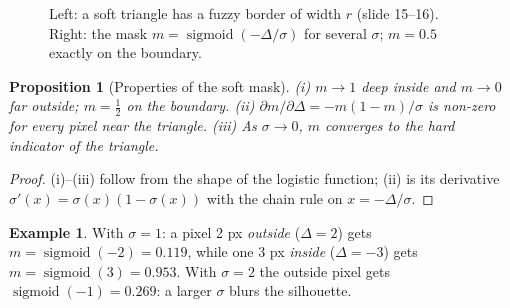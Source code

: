 \documentclass[11pt,a4paper]{article}
\DeclareMathOperator{\sigmoid}{sigmoid}
\theoremstyle{definition}
\newtheorem{example}[definition]{Example}
\theoremstyle{algstyle}
\theoremstyle{plain}
\newtheorem{proposition}[definition]{Proposition}
\theoremstyle{remark}
\begin{document}
\begin{figure}[htbp]
\centering
{}
\caption{Left: a soft triangle has a fuzzy border of width $r$ (slide 15--16). Right: the mask $m=\sigmoid(-\Delta/\sigma)$ for several $\sigma$; $m=0.5$ exactly on the boundary.}
\end{figure}

\begin{proposition}[Properties of the soft mask]
(i) $m\to1$ deep inside and $m\to0$ far outside; $m=\tfrac12$ on the boundary. (ii) $\partial m/\partial\Delta=-m(1-m)/\sigma$ is non-zero for every pixel near the triangle. (iii) As $\sigma\to0$, $m$ converges to the hard indicator of the triangle.
\end{proposition}
\begin{proof}
(i)--(iii) follow from the shape of the logistic function; (ii) is its derivative $\sigma'(x)=\sigma(x)(1-\sigma(x))$ with the chain rule on $x=-\Delta/\sigma$.
\end{proof}

\begin{example}
With $\sigma=1$: a pixel 2 px \emph{outside} ($\Delta=2$) gets $m=\sigmoid(-2)=0.119$, while one 3 px \emph{inside} ($\Delta=-3$) gets $m=\sigmoid(3)=0.953$. With $\sigma=2$ the outside pixel gets $\sigmoid(-1)=0.269$: a larger $\sigma$ blurs the silhouette.
\end{example}
\end{document}
